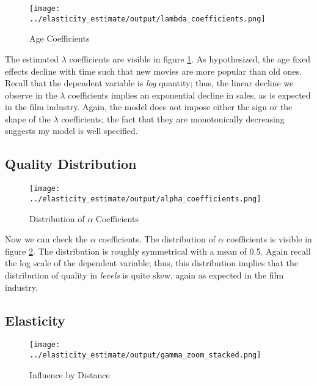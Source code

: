 \documentclass{article}
\begin{document}
\begin{figure}
    \begin{center}
        \texttt{[image: ../elasticity\_estimate/output/lambda\_coefficients.png]}
        \caption{Age Coefficients}
        \label{fig:age_coefs}
    \end{center}
\end{figure}

The estimated $\lambda$ coefficients are visible in figure \ref{fig:age_coefs}. As hypothesized, the age fixed effects decline with time such that new movies are more popular than old ones. Recall that the dependent variable is \emph{log} quantity; thus, the linear decline we observe in the $\lambda$ coefficients implies an exponential decline in sales, as is expected in the film industry. Again, the model does not impose either the sign or the shape of the $\lambda$ coefficients; the fact that they are monotonically decreasing suggests my model is well specified.

\subsection{Quality Distribution}

\begin{figure}
    \begin{center}
        \texttt{[image: ../elasticity\_estimate/output/alpha\_coefficients.png]}
        \caption{Distribution of $\alpha$ Coefficients}
        \label{fig:alpha_dist}
    \end{center}
\end{figure}

Now we can check the $\alpha$ coefficients. The distribution of $\alpha$ coefficients is visible in figure \ref{fig:alpha_dist}. The distribution is roughly symmetrical with a mean of 0.5. Again recall the log scale of the dependent variable; thus, this distribution implies that the distribution of quality in \emph{levels} is quite skew, again as expected in the film industry. 

\subsection{Elasticity}

\begin{figure}
    \begin{center}
        \texttt{[image: ../elasticity\_estimate/output/gamma\_zoom\_stacked.png]}
        \caption{Influence by Distance}
        \label{fig:gamma_zoomed}
    \end{center}
\end{figure}
\end{document}
